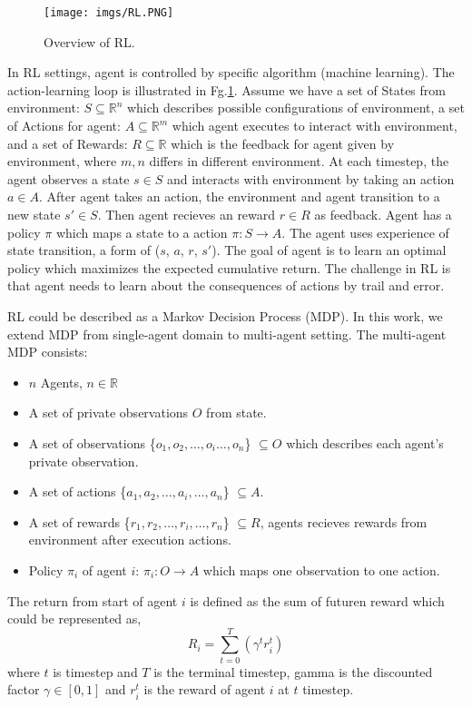 \documentclass[11pt,twocolumn]{jarticle} %
\begin{document}
\begin{figure}[h]
 \begin{center}
  \texttt{[image: imgs/RL.PNG]}
  \caption{
  Overview of RL.
  }
  \label{fig:rl}
 \end{center}
\end{figure}

In RL settings, agent is controlled by specific algorithm (machine learning). The action-learning loop is illustrated in Fg.\ref{fig:rl}. Assume we have a set of States from environment: $S \subseteq \mathbb{R}^n$ which describes possible configurations of environment, a set of Actions for agent: $A \subseteq \mathbb{R}^m$ which agent executes to interact with environment, and a set of Rewards: $R \subseteq \mathbb{R}$ which is the feedback for agent given by environment, where $m, n$ differs in different environment. At each timestep, the agent observes a state $s \in S$ and interacts with environment by taking an action $a \in A$. After agent takes an action, the environment and agent transition to a new state $s' \in S$. Then agent recieves an reward $r \in R$  as feedback. Agent has a policy $\pi$ which maps  a state to a action $\pi: S \rightarrow A$. The agent uses experience of state transition, a form of ($s$, $a$, $r$, $s'$). The goal of agent is to learn an optimal policy which maximizes the expected cumulative return. The challenge in RL is that agent needs to learn about the consequences of actions by trail and error. \par

RL could be described as a Markov Decision Process (MDP). In this work, we extend MDP from single-agent domain to multi-agent setting. The multi-agent MDP consists:
\begin{itemize}
  \item $n$ Agents, $n \in \mathbb{R}$
  \item A set of private observations $O$ from state. 
  \item A set of observations \{${o_1, o_2,\ldots, o_i\ldots, o_n}$\} $\subseteq O$ which describes each agent's private observation.
  \item A set of actions \{${a_1, a_2,\ldots, a_i,\ldots, a_n}$\} $\subseteq A$.
  \item A set of rewards \{${r_1, r_2,\ldots, r_i,\ldots, r_n}$\} $\subseteq R$, agents recieves rewards from environment after execution actions.
  \item Policy $\pi_i$ of agent $i$: $\pi_i: O \rightarrow A$ which maps one observation to one action.
\end{itemize}
The return from start of agent $i$ is defined as the sum of futuren reward which could be represented as, 
$$ R_i = \sum_{t=0}^{T}(\gamma^t r^{t}_i) $$
where $t$ is timestep and $T$ is the terminal timestep, gamma is the discounted factor $\gamma \in [0, 1]$ and $r^{t}_i$ is the reward of agent $i$ at $t$ timestep.
\end{document}
